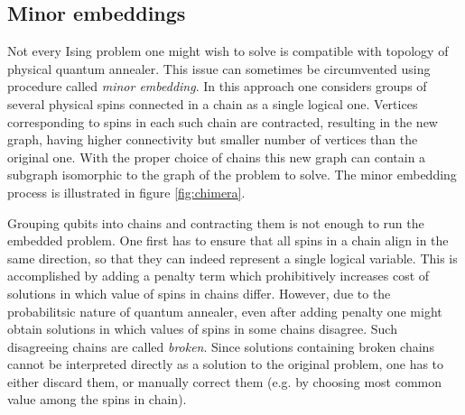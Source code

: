 \subsection{Minor embeddings}
Not every Ising problem one might wish to solve is compatible with topology of physical quantum annealer. This issue can sometimes be circumvented using procedure called \emph{minor embedding}. In this approach one considers groups of several physical spins connected in a chain as a single logical one. Vertices corresponding to spins in each such chain are contracted, resulting in the new graph, having higher connectivity but smaller number of vertices than the original one. With the proper choice of chains this new graph can contain a subgraph isomorphic to the graph of the problem to solve. The minor embedding process is illustrated in figure \ref{fig:chimera}.

Grouping qubits into chains and contracting them is not enough to run the embedded problem. One first has to ensure that all spins in a chain align in the same direction, so that they can indeed represent a single logical variable. This is accomplished by adding a penalty term which prohibitively increases cost of solutions in which value of spins in chains differ. However, due to the probabilitsic nature of quantum annealer, even after adding penalty one might obtain solutions in which values of spins in some chains disagree. Such disagreeing chains are called \emph{broken}. Since solutions containing broken chains cannot be interpreted directly as a solution to the original problem, one has to either discard them, or manually correct them (e.g. by choosing most common value among the spins in chain).


